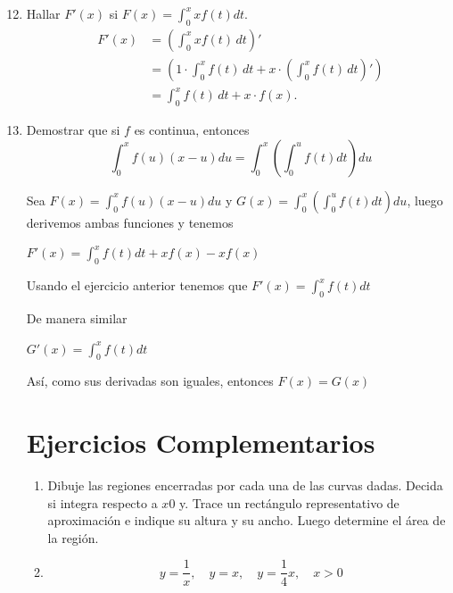 \documentclass{report}
\begin{document}
\begin{enumerate}[label=\textcolor{Red}{\textbf{\arabic*.}}]
        \setcounter{enumi}{11}
        \item Hallar  $F'(x)$ si $F(x)=\int_{0 }^{x}xf(t)dt$.
        \begin{align*}
            F'(x) &= \left( \int_{0}^{x} xf(t) \, dt \right)' \\
            &= \left( 1 \cdot \int_{0}^{x} f(t) \, dt + x \cdot \left( \int_{0}^{x} f(t) \, dt \right)' \right) \\
            &= \int_{0}^{x} f(t) \, dt + x \cdot f(x).
        \end{align*}

        \item Demostrar que si $f$ es continua, entonces
        $$\int_{0}^{x}f(u)(x-u)du=\int_{0}^{x}\left( \int_{0}^{u}f(t)dt\right) du$$

        Sea $F(x) = \int_{0}^{x}f(u)(x-u)du$ y $G(x) = \int_{0}^{x}\left( \int_{0}^{u}f(t)dt\right) du$, luego derivemos ambas funciones y tenemos

        $F'(x) = \int_{0 }^{x}f(t)dt+x f(x)- xf(x)$

        Usando el ejercicio anterior tenemos que $F'(x) = \int_{0}^{x}f(t)dt$

        De manera similar

        $G'(x) = \int_{0}^{x}f(t)dt$

        Así, como sus derivadas son iguales, entonces $F(x) = G(x)$\pagebreak

        \section*{\textcolor{OliveGreen}{Ejercicios Complementarios}}

        \begin{enumerate}[label=\textcolor{OliveGreen}{\textbf{\arabic*.}}]
            \item Dibuje las regiones encerradas por cada una de las curvas dadas. Decida si integra respecto a $x 0$ y. Trace un rectángulo representativo de aproximación e indique su altura y su ancho. Luego determine el área de la región.
                \item $$
                y=\frac{1}{x}, \quad y=x, \quad y=\frac{1}{4} x, \quad x>0
                $$


\end{enumerate}
\end{enumerate}
\end{document}
